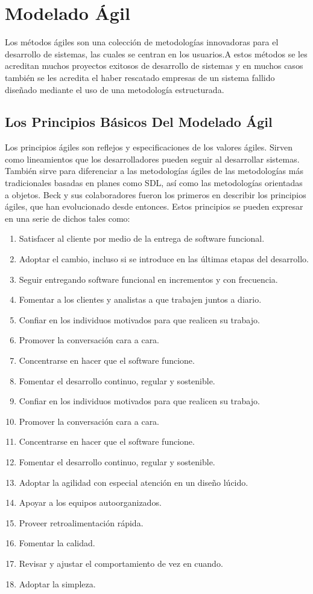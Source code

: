 \section{Modelado Ágil}
Los métodos ágiles son una colección de metodologías innovadoras para el desarrollo de sistemas, las cuales se centran en los usuarios.A estos métodos se les acreditan muchos proyectos exitosos de desarrollo de sistemas y en muchos casos también se les acredita el haber rescatado empresas de un sistema fallido diseñado mediante el uso de una metodología estructurada.

\subsection{Los Principios Básicos Del Modelado Ágil  }
Los principios ágiles son reflejos y especificaciones de los valores ágiles. Sirven como lineamientos que los desarrolladores pueden seguir al desarrollar sistemas. También sirve para diferenciar a las metodologías ágiles de las metodologías más tradicionales basadas en planes como SDL, así como las metodologías orientadas a objetos. Beck y sus colaboradores fueron los primeros en describir los principios ágiles, que han evolucionado desde entonces. Estos principios se pueden expresar en una serie de dichos tales como: 
\begin{enumerate}
\item Satisfacer al cliente por medio de la entrega de software funcional. 
\item Adoptar el cambio, incluso si se introduce en las últimas etapas del desarrollo. 
\item Seguir entregando software funcional en incrementos y con frecuencia. 
\item Fomentar a los clientes y analistas a que trabajen juntos a diario. 
\item Confiar en los individuos motivados para que realicen su trabajo. 
\item Promover la conversación cara a cara. 
\item Concentrarse en hacer que el software funcione.
\item Fomentar el desarrollo continuo, regular y sostenible.
\item Confiar en los individuos motivados para que realicen su trabajo. 
\item Promover la conversación cara a cara. 
\item Concentrarse en hacer que el software funcione.
\item Fomentar el desarrollo continuo, regular y sostenible.
\item Adoptar la agilidad con especial atención en un diseño lúcido.
\item Apoyar a los equipos autoorganizados. 
\item Proveer retroalimentación rápida. 
\item Fomentar la calidad. 
\item Revisar y ajustar el comportamiento de vez en cuando. 
\item Adoptar la simpleza.
\end{enumerate}


